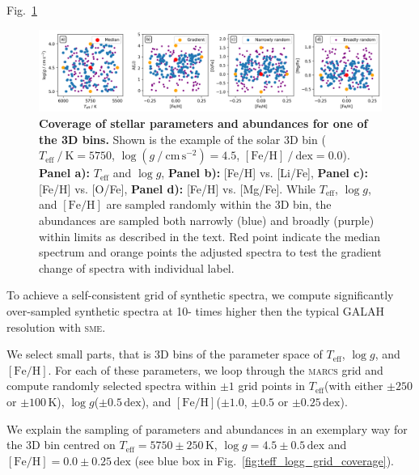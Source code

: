\documentclass[
  journal=pasa,
  manuscript=research-paper, %
  year=2023,
  volume=37
]{cup-journal}
\newcommand{\Teff}{$T_\mathrm{eff}$\xspace}
\newcommand{\logg}{$\log g$\xspace}
\newcommand{\feh}{$\mathrm{[Fe/H]}$\xspace}
\newcommand{\sme}{\textsc{sme}\xspace}
\newcommand{\marcs}{\textsc{marcs}\xspace}
\newcommand{\dex}{\,\mathrm{dex}}	%
\newcommand{\K}{\,\mathrm{K}}	%
\begin{document}
Fig.~\ref{fig:example_3d_bin_sample}

\begin{figure}[h!]
 \centering
 \includegraphics[width=\textwidth]{figures/example_3d_bin_sample.png}
 \caption{\textbf{Coverage of stellar parameters and abundances for one of the 3D bins.} Shown is the example of the solar 3D bin ($T_\mathrm{eff}~/~\mathrm{K} = 5750$, $\log (g~/~\mathrm{cm\,s^{-2}}) = 4.5$, $\mathrm{[Fe/H]}~/~\mathrm{dex} = 0.0$). \textbf{Panel a):} \Teff and \logg, \textbf{Panel b):} [Fe/H] vs. [Li/Fe], \textbf{Panel c):} [Fe/H] vs. [O/Fe], \textbf{Panel d):} [Fe/H] vs. [Mg/Fe]. While \Teff, \logg, and \feh are sampled randomly within the 3D bin, the abundances are sampled both narrowly (blue) and broadly (purple) within limits as described in the text. Red point indicate the median spectrum and orange points the adjusted spectra to test the gradient change of spectra with individual label.}
 \label{fig:example_3d_bin_sample}
\end{figure}

To achieve a self-consistent grid of synthetic spectra, we compute significantly over-sampled synthetic spectra at 10- times higher then the typical GALAH resolution with \sme.

We select small parts, that is 3D bins of the parameter space of \Teff, \logg, and \feh. For each of these parameters, we loop through the \marcs grid and compute randomly selected spectra within $\pm 1$ grid points in \Teff (with either $\pm 250$ or $\pm 100\K$), \logg ($\pm 0.5\dex$), and \feh ($\pm 1.0$, $\pm 0.5$ or $\pm 0.25\dex $).

We explain the sampling of parameters and abundances in an exemplary way for the 3D bin centred on $T_\text{eff} = 5750\pm250\K$, $\log g = 4.5\pm0.5\dex$ and $\mathrm{[Fe/H]} = 0.0\pm0.25\dex$ (see blue box in Fig.~\ref{fig:teff_logg_grid_coverage}).
\end{document}
